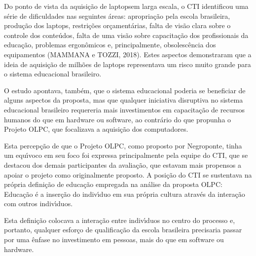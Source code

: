 \documentclass[
12pt,		%
openright,	%
twoside,  %
a4paper,			%
chapter=TITLE,		%
english,			%
french,				%
spanish,			%
brazil				%
]{USPSC-classe/USPSC}
\begin{document}
Do ponto de vista da aquisi\c{c}\~ao de \textquotedbl laptops\textquotedbl  em larga escala, o CTI identificou uma s\'erie de dificuldades nas seguintes \'areas: apropria\c{c}\~ao pela escola brasileira, produ\c{c}\~ao dos laptops, restri\c{c}\~oes or\c{c}ament\'arias, falta de vis\~ao clara sobre o controle dos conte\'udos, falta de uma vis\~ao sobre capacita\c{c}\~ao dos profissionais da educa\c{c}\~ao, problemas ergon\^omicos e, principalmente, obsolesc\^encia dos equipamentos  (MAMMANA e TOZZI, 2018). Estes aspectos demonstraram que a ideia de aquisi\c{c}\~ao de milh\~oes de laptops representava um risco muito grande para o sistema educacional brasileiro.








O estudo apontava, tamb\'em, que o sistema educacional poderia se beneficiar de alguns aspectos da proposta, mas que qualquer iniciativa disruptiva no sistema educacional brasileiro requereria mais investimentos em capacita\c{c}\~ao de recursos humanos do que em hardware ou software, ao contr\'ario do que propunha o Projeto OLPC, que focalizava a aquisi\c{c}\~ao dos computadores.








Esta percep\c{c}\~ao de que o Projeto OLPC, como proposto por Negroponte, tinha um equ\'{\i}voco em seu foco foi expressa principalmente pela equipe do CTI, que se destacou dos demais participantes da avalia\c{c}\~ao, que estavam mais propensos a apoiar o projeto como originalmente proposto. A posi\c{c}\~ao do CTI se sustentava na pr\'opria defini\c{c}\~ao de educa\c{c}\~ao empregada na an\'alise da proposta OLPC: \textquotedbl Educa\c{c}\~ao \'e a inser\c{c}\~ao do indiv\'{\i}duo em sua pr\'opria cultura atrav\'es da intera\c{c}\~ao com outros indiv\'{\i}duos\textquotedbl .








Esta defini\c{c}\~ao colocava a intera\c{c}\~ao entre indiv\'{\i}duos no centro do processo e, portanto, qualquer esfor\c{c}o de qualifica\c{c}\~ao da escola brasileira precisaria passar por uma \^enfase no investimento em \textquotedbl pessoas, mais do que em software ou hardware\textquotedbl .
\end{document}
